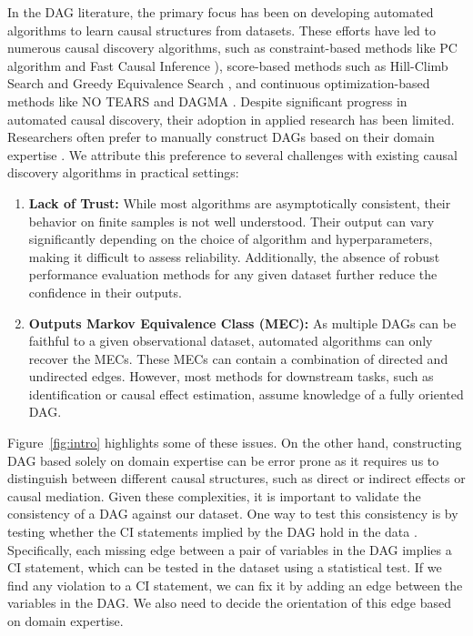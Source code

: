 \documentclass{uai2025} %
\begin{document}
In the DAG literature, the primary focus has been on developing automated
algorithms to learn causal structures from datasets. These efforts have led to
numerous causal discovery algorithms, such as constraint-based methods like PC
algorithm \citep{Spirtes2001} and Fast Causal Inference \citep{Spirtes2000}),
score-based methods such as Hill-Climb Search and Greedy Equivalence Search
\citep{Chickering2002}, and continuous optimization-based methods like NO TEARS
\citep{Zheng2018} and DAGMA \citep{Bello2022}. Despite significant progress in
automated causal discovery, their adoption in applied research has been
limited. Researchers often prefer to manually construct DAGs based on their
domain expertise \citep{Tennant2020, Petersen2021}. We attribute this
preference to several challenges with existing causal discovery algorithms in
practical settings:

\begin{enumerate}
	\item \textbf{Lack of Trust:} While most algorithms are asymptotically
		consistent, their behavior on finite samples is not well
		understood. Their output can vary significantly depending on
		the choice of algorithm and hyperparameters, making it
		difficult to assess reliability. Additionally, the absence of
		robust performance evaluation methods for any given dataset
		further reduce the confidence in their outputs. 
	\item \textbf{Outputs Markov Equivalence Class (MEC):} As multiple
		DAGs can be faithful to a given observational dataset, automated 
		algorithms can only recover the MECs. These MECs can contain a
		combination of directed and undirected edges. However, most
		methods for downstream tasks, such as identification or causal
		effect estimation, assume knowledge of a fully oriented DAG. 
\end{enumerate}

Figure~\ref{fig:intro} highlights some of these issues. On the other hand,
constructing DAG based solely on domain expertise can be error prone as it
requires us to distinguish between different causal structures, such as direct
or indirect effects or causal mediation. Given these complexities, it is
important to validate the consistency of a DAG against our dataset. One way to
test this consistency is by testing whether the CI statements implied by the
DAG hold in the data \citep{Ankan2021}. Specifically, each missing edge between
a pair of variables in the DAG implies a CI statement, which can be tested in
the dataset using a statistical test. If we find any violation to a CI
statement, we can fix it by adding an edge between the variables in the DAG. We
also need to decide the orientation of this edge based on domain expertise.
\end{document}
